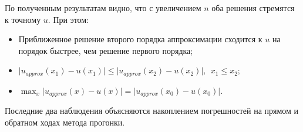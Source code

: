 \documentclass[a4paper,12pt]{article}
\begin{document}
\begin{flushleft}
  По полученным результатам видно, что с увеличением $n$ оба решения стремятся к точному $u$.\linebreak\linebreak 
  При этом:
  \begin{itemize}
    \item Приближенное решение второго порядка аппроксимации сходится к $u$ на порядок быстрее, чем решение первого порядка;
    \item \(\mathopen| u_{approx}(x_1) - u(x_1) \mathclose| \le \mathopen| u_{approx}(x_2) - u(x_2) \mathclose|,~~x_1 \le x_2\);
    \item \(\displaystyle\max_x{\mathopen| u_{approx}(x) - u(x) \mathclose|} = \mathopen| u_{approx}(x_0) - u(x_0) \mathclose| \).
  \end{itemize}

  Последние два наблюдения объясняются накоплением погрешностей на прямом и обратном ходах метода прогонки.
\end{flushleft}
\end{document}
